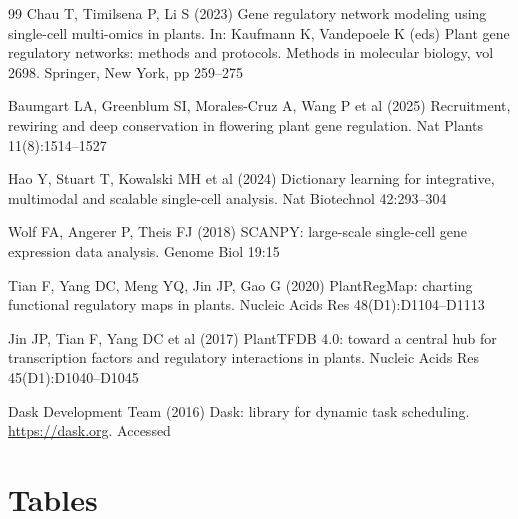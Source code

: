 \begin{thebibliography}{99}
 Chau T, Timilsena P, Li S (2023) Gene regulatory network modeling using single-cell multi-omics in plants. In: Kaufmann K, Vandepoele K (eds) Plant gene regulatory networks: methods and protocols. Methods in molecular biology, vol 2698. Springer, New York, pp 259--275

 Baumgart LA, Greenblum SI, Morales-Cruz A, Wang P et al (2025) Recruitment, rewiring and deep conservation in flowering plant gene regulation. Nat Plants 11(8):1514--1527

 Hao Y, Stuart T, Kowalski MH et al (2024) Dictionary learning for integrative, multimodal and scalable single-cell analysis. Nat Biotechnol 42:293--304

 Wolf FA, Angerer P, Theis FJ (2018) SCANPY: large-scale single-cell gene expression data analysis. Genome Biol 19:15

 Tian F, Yang DC, Meng YQ, Jin JP, Gao G (2020) PlantRegMap: charting functional regulatory maps in plants. Nucleic Acids Res 48(D1):D1104--D1113

 Jin JP, Tian F, Yang DC et al (2017) PlantTFDB 4.0: toward a central hub for transcription factors and regulatory interactions in plants. Nucleic Acids Res 45(D1):D1040--D1045

 Dask Development Team (2016) Dask: library for dynamic task scheduling. \url{https://dask.org}. Accessed 

\end{thebibliography}

\section*{Tables}

